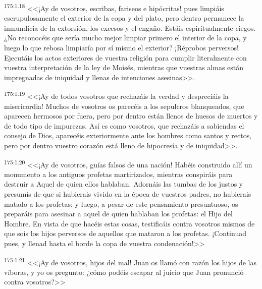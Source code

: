\par 
\textsuperscript{175:1.18} <<¡Ay de vosotros, escribas, fariseos e hipócritas! pues limpiáis escrupulosamente el exterior de la copa y del plato, pero dentro permanece la inmundicia de la extorsión, los excesos y el engaño. Estáis espiritualmente ciegos. ¿No reconocéis que sería mucho mejor limpiar primero el interior de la copa, y luego lo que rebosa limpiaría por sí mismo el exterior? ¡Réprobos perversos! Ejecutáis los actos exteriores de vuestra religión para cumplir literalmente con vuestra interpretación de la ley de Moisés, mientras que vuestras almas están impregnadas de iniquidad y llenas de intenciones asesinas>>.

\par 
\textsuperscript{175:1.19} <<¡Ay de todos vosotros que rechazáis la verdad y despreciáis la misericordia! Muchos de vosotros os parecéis a los sepulcros blanqueados, que aparecen hermosos por fuera, pero por dentro están llenos de huesos de muertos y de todo tipo de impurezas. Así es como vosotros, que rechazáis a sabiendas el consejo de Dios, aparecéis exteriormente ante los hombres como santos y rectos, pero por dentro vuestro corazón está lleno de hipocresía y de iniquidad>>.

\par 
\textsuperscript{175:1.20} <<¡Ay de vosotros, guías falsos de una nación! Habéis construido allí un monumento a los antiguos profetas martirizados, mientras conspiráis para destruir a Aquel de quien ellos hablaban. Adornáis las tumbas de los justos y presumís de que si hubierais vivido en la época de vuestros padres, no hubierais matado a los profetas; y luego, a pesar de este pensamiento presuntuoso, os preparáis para asesinar a aquel de quien hablaban los profetas: el Hijo del Hombre. En vista de que hacéis estas cosas, testificáis contra vosotros mismos de que sois los hijos perversos de aquellos que mataron a los profetas. ¡Continuad pues, y llenad hasta el borde la copa de vuestra condenación!>>

\par 
\textsuperscript{175:1.21} <<¡Ay de vosotros, hijos del mal! Juan os llamó con razón los hijos de las víboras, y yo os pregunto: ¿cómo podéis escapar al juicio que Juan pronunció contra vosotros?>>

